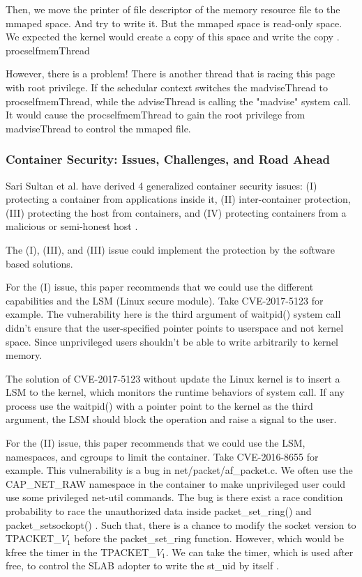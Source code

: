\documentclass[12pt,a4paper]{article}
\begin{document}
Then, we move the printer of file descriptor of the memory resource file to the mmaped
space. And try to write it. But the mmaped space is read-only space. We expected the
kernel would create a copy of this space and write the copy \cite{root_exploit}.\\
\hypertarget{procself}{procselfmemThread}


However, there is a problem! There is another thread that is racing this page with root
privilege. If the schedular context switches the madviseThread to procselfmemThread, while
the adviseThread is calling the "madvise" system call. It would cause the
procselfmemThread to gain the root privilege from madviseThread to control the mmaped file.

\subsubsection{Container Security: Issues, Challenges, and Road Ahead}
Sari Sultan et al. \cite{Road_Ahead} have derived 4 generalized container security issues:
(\RN{1}) protecting a container from applications inside it, (\RN{2}) inter-container
protection, (\RN{3}) protecting the host from containers, and (\RN{4}) protecting containers
from a malicious or semi-honest host \cite{Road_Ahead}.

The (\RN{1}), (\RN{3}), and (\RN{3}) issue could implement the protection by the software
based solutions.

For the (\RN{1}) issue, this paper recommends that
we could use the different capabilities and the LSM (Linux secure module). Take
CVE-2017-5123 \cite{CVE-2017-5123} for example. The vulnerability here is the third argument of
waitpid() system call didn't ensure that the user-specified pointer points to userspace
and not kernel space. Since unprivileged users shouldn’t be able to write arbitrarily
to kernel memory.

The solution of CVE-2017-5123 without update the Linux kernel is to insert a
LSM to the kernel, which monitors the runtime behaviors of system call. If any process
use the waitpid() with a pointer point to the kernel as the third argument, the LSM should
block the operation and raise a signal to the user.

For the (\RN{2}) issue, this paper recommends that we could use the
LSM, namespaces, and cgroups to limit the container. Take CVE-2016-8655 \cite{CVE-2016-8655}
for example. This vulnerability is a bug in net/packet/af\_packet.c. We often use the
CAP\_NET\_RAW namespace in the container to make unprivileged user could use some privileged
net-util commands. The bug is there exist a race condition probability to race the unauthorized
data inside packet\_set\_ring() and packet\_setsockopt() \cite{CVE-2016-8655-lwn}. Such that,
there is a chance to modify the socket version to TPACKET\_$V_1$ before the packet\_set\_ring
function. However, which would be kfree the timer in the TPACKET\_$V_1$. We can take the timer,
which is used after free, to control the SLAB adopter to write the st\_uid by itself
\cite{AF_PACKET}.
\end{document}

